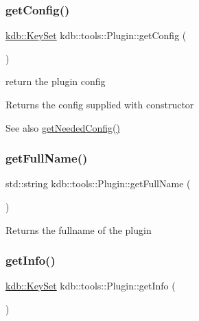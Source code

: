 \subsubsection{\texorpdfstring{get\+Config()}{getConfig()}}
{\footnotesize\ttfamily \hyperlink{classkdb_1_1KeySet}{kdb\+::\+Key\+Set} kdb\+::tools\+::\+Plugin\+::get\+Config (\begin{DoxyParamCaption}{ }\end{DoxyParamCaption})}



return the plugin config 

\begin{DoxyReturn}{Returns}
the config supplied with constructor 
\end{DoxyReturn}
\begin{DoxySeeAlso}{See also}
\hyperlink{classkdb_1_1tools_1_1Plugin_ad2a0a4a64d17c479e7cd8b1402275cc7}{get\+Needed\+Config()} 
\end{DoxySeeAlso}
\mbox{\label{classkdb_1_1tools_1_1Plugin_acbe982e7bbb71aafb49b0d632e8650c9}} 
\subsubsection{\texorpdfstring{get\+Full\+Name()}{getFullName()}}
{\footnotesize\ttfamily std\+::string kdb\+::tools\+::\+Plugin\+::get\+Full\+Name (\begin{DoxyParamCaption}{ }\end{DoxyParamCaption})}

\begin{DoxyReturn}{Returns}
the fullname of the plugin 
\end{DoxyReturn}
\mbox{\label{classkdb_1_1tools_1_1Plugin_aa4eac3b2b515104a0d595c717c546ec0}} 
\subsubsection{\texorpdfstring{get\+Info()}{getInfo()}}
{\footnotesize\ttfamily \hyperlink{classkdb_1_1KeySet}{kdb\+::\+Key\+Set} kdb\+::tools\+::\+Plugin\+::get\+Info (\begin{DoxyParamCaption}{ }\end{DoxyParamCaption})\hspace{0.3cm}{\ttfamily [inline]}}



